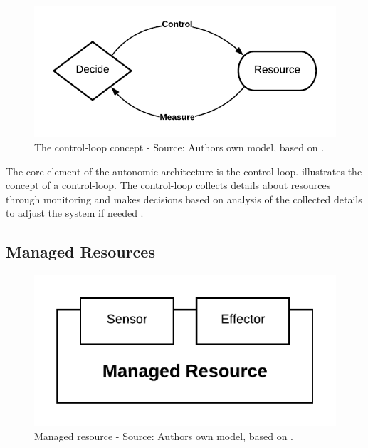 \begin{figure}[h]
\centering
\includegraphics[scale=1]{images/02_theoretical_foundation/autonomic_computing/control_loop}
\caption{The control-loop concept - Source: Authors own model, based on \cite{Murch2004Autonomic}.}
\label{fig:ac_control_loop}
\end{figure}

The core element of the autonomic architecture is the control-loop.  illustrates the concept of a control-loop. The control-loop collects details about resources through monitoring and makes decisions based on analysis of the collected details to adjust the system if needed \cite{Murch2004Autonomic}.


\subsection{Managed Resources}

\begin{figure}[h]
\centering
\includegraphics[scale=1]{images/02_theoretical_foundation/autonomic_computing/managed_resource}
\caption{Managed resource - Source: Authors own model, based on \cite{Jacob2004AutonomicSolution}.}
\label{fig:ac_managed_resource}
\end{figure}

